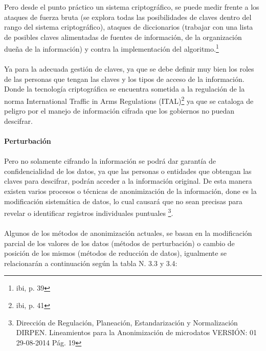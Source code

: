\documentclass[a4paper,openright,12pt]{book}
\theoremstyle{definition}
\theoremstyle{remark}
\begin{document}
Pero desde el punto práctico un sistema criptográfico, se puede medir frente a los ataques de fuerza bruta (se explora todas las posibilidades de claves dentro del rango del sistema criptográfico),  ataques de diccionarios (trabajar con una lista de posibles claves alimentadas de fuentes de información, de la organización dueña de la información) y contra la implementación del algoritmo.\footnote{ibi, p. 39}\\\\
Ya para la adecuada gestión de claves, ya que se debe definir muy bien los roles de las personas que tengan las claves y los tipos de acceso de la información. Donde la tecnología criptográfica se encuentra sometida a la regulación de la norma International Traffic in Arms Regulations (ITAL)\footnote{ibi, p. 41} ya que se cataloga de peligro por el manejo de información cifrada que los gobiernos no puedan descifrar.\\\\
\textbf{Perturbación}\\\\
Pero no solamente cifrando la información se podrá dar garantía de confidencialidad de los datos, ya que las personas o entidades que obtengan las claves para descifrar, podrán acceder a la información original. De esta manera existen varios procesos o técnicas de anonimización de la información, done es la modificación sistemática de datos, lo cual causará que no sean precisas para revelar o identificar registros individuales puntuales \footnote{Dirección de Regulación, Planeación, Estandarización y Normalización DIRPEN. Lineamientos para
la Anonimización de microdatos VERSIÓN: 01 29-08-2014 Pág. 19}.\\\\
Algunos de los métodos de anonimización actuales, se basan en la modificación parcial de los valores de los datos (métodos de perturbación) o cambio de posición de los mismos (métodos de reducción de datos), igualmente se relacionarán a continuación según la tabla N. 3.3 y 3.4: 
\end{document}
